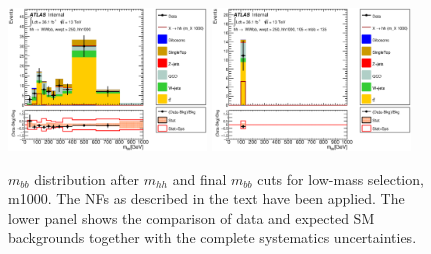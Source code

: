 \begin{figure}
\begin{center}
\includegraphics*[width=0.47\textwidth] {figures/Unblinded_mbb/C_reOpt700_mww_bbpt210_wwpt250_hh1000_bbMass_regionA_met25d020.eps}
\includegraphics*[width=0.47\textwidth] {figures/Unblinded_mbb/C_reOpt700_mww_bbpt210_wwpt250_hh1000_mbb_bbMass_regionA_met25d020.eps}
\caption[$m_{bb}$ distribution after $m_{hh}$ and final $m_{bb}$ cuts for low-mass selection, m1000.]{$m_{bb}$ distribution after $m_{hh}$ and final $m_{bb}$ cuts for low-mass selection, m1000. The NFs as described in the text have been applied. The lower panel shows the comparison of data and expected SM backgrounds together with the complete systematics uncertainties.}
\end{center}
\end{figure}

